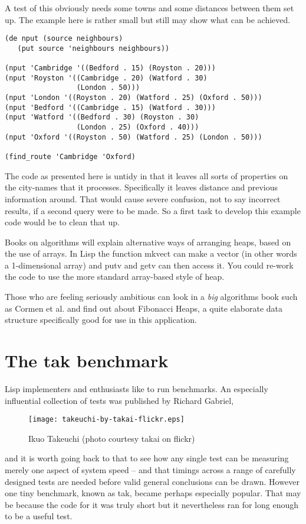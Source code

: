 A test of this obviously needs some towns and some
distances between them set up. The example here is rather small
but still may show what can be achieved.
{\small\begin{verbatim}
(de nput (source neighbours)
   (put source 'neighbours neighbours))

(nput 'Cambridge '((Bedford . 15) (Royston . 20)))
(nput 'Royston '((Cambridge . 20) (Watford . 30)
                 (London . 50)))
(nput 'London '((Royston . 20) (Watford . 25) (Oxford . 50)))
(nput 'Bedford '((Cambridge . 15) (Watford . 30)))
(nput 'Watford '((Bedford . 30) (Royston . 30)
                 (London . 25) (Oxford . 40)))
(nput 'Oxford '((Royston . 50) (Watford . 25) (London . 50)))

(find_route 'Cambridge 'Oxford)
\end{verbatim}}

The code as presented here is untidy in that it leaves all sorts of
properties on the city-names that it processes. Specifically it leaves
{\tx distance} and {\tx previous} information around. That would cause
severe confusion, not to say incorrect results, if a second query were to
be made. So a first task to develop this example code would be to
clean that up.

Books on algorithms will explain alternative ways of arranging heaps, based
on the use of arrays. In Lisp the function {\tx mkvect} can make a vector
(in other words a 1-dimensional array) and {\tx putv} and {\tx getv}
can then access it. You could re-work the code to use the more standard
array-based style of heap.

Those who are feeling seriously ambitious can look in a {\em big} algorithms
book such as Cormen et al.\cite{cormen} and find out about
Fibonacci Heaps, a quite elaborate data structure specifically good for use
in this application.

\section{The {\tx tak} benchmark}
Lisp implementers and enthusiasts like to run benchmarks. An especially
influential collection of tests was published by Richard Gabriel\cite{Gabriel},
\begin{wrapfigure}{l}{2.3in}
{\centering
\texttt{[image: takeuchi-by-takai-flickr.eps]}}
\caption{Ikuo Takeuchi (photo courtesy takai on flickr)}
\end{wrapfigure} and it is worth going back to that to see how any single test can be measuring
merely one aspect of system speed -- and that timings across a range
of carefully designed tests are needed before valid general conclusions can
be drawn. However one tiny benchmark, known as {\tx tak}, became perhaps
especially popular. That may be because the code for it was truly short
but it nevertheless ran for long enough to be a useful test.

